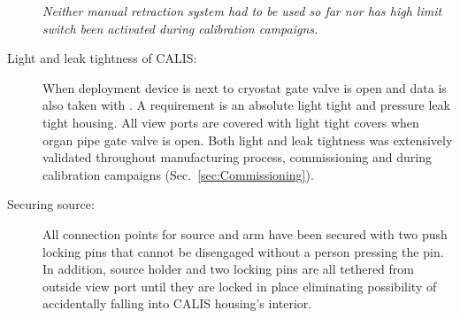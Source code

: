 \begin{description}
\textit{Neither manual retraction system had to be used so far nor has high limit switch been activated during calibration campaigns.}
    
\item[Light and leak tightness of CALIS:]
When deployment device is next to cryostat gate valve is open and data is also taken with \lsv. A requirement is an absolute light tight and pressure leak tight housing. All view ports are covered with light tight covers when organ pipe gate valve is open. Both light and leak tightness was extensively validated throughout manufacturing process, commissioning and during calibration campaigns (Sec.~\ref{sec:Commissioning}).

\item[Securing source:] 
All connection points for source and arm have been secured with two push locking pins that cannot be disengaged without a person pressing the pin. In addition, source holder and two locking pins are all tethered from outside view port until they are locked in place eliminating possibility of accidentally falling into CALIS housing's interior.

\end{description}
	
